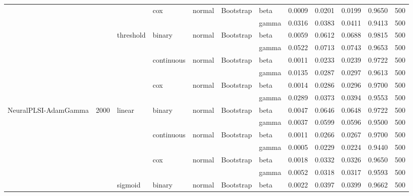 \begin{tabular}{lllllllrrrrr}
\cline{4-12} \cline{5-12} \cline{6-12}
 &  &  & \multirow[t]{2}{*}{cox} & \multirow[t]{2}{*}{normal} & \multirow[t]{2}{*}{Bootstrap} & beta & 0.0009 & 0.0201 & 0.0199 & 0.9650 & 500 \\
 &  &  &  &  &  & gamma & 0.0316 & 0.0383 & 0.0411 & 0.9413 & 500 \\
\cline{3-12} \cline{4-12} \cline{5-12} \cline{6-12}
 &  & \multirow[t]{6}{*}{threshold} & \multirow[t]{2}{*}{binary} & \multirow[t]{2}{*}{normal} & \multirow[t]{2}{*}{Bootstrap} & beta & 0.0059 & 0.0612 & 0.0688 & 0.9815 & 500 \\
 &  &  &  &  &  & gamma & 0.0522 & 0.0713 & 0.0743 & 0.9653 & 500 \\
\cline{4-12} \cline{5-12} \cline{6-12}
 &  &  & \multirow[t]{2}{*}{continuous} & \multirow[t]{2}{*}{normal} & \multirow[t]{2}{*}{Bootstrap} & beta & 0.0011 & 0.0233 & 0.0239 & 0.9722 & 500 \\
 &  &  &  &  &  & gamma & 0.0135 & 0.0287 & 0.0297 & 0.9613 & 500 \\
\cline{4-12} \cline{5-12} \cline{6-12}
 &  &  & \multirow[t]{2}{*}{cox} & \multirow[t]{2}{*}{normal} & \multirow[t]{2}{*}{Bootstrap} & beta & 0.0014 & 0.0286 & 0.0296 & 0.9700 & 500 \\
 &  &  &  &  &  & gamma & 0.0289 & 0.0373 & 0.0394 & 0.9553 & 500 \\
\cline{1-12} \cline{2-12} \cline{3-12} \cline{4-12} \cline{5-12} \cline{6-12}
\multirow[t]{18}{*}{NeuralPLSI-AdamGamma} & \multirow[t]{18}{*}{2000} & \multirow[t]{6}{*}{linear} & \multirow[t]{2}{*}{binary} & \multirow[t]{2}{*}{normal} & \multirow[t]{2}{*}{Bootstrap} & beta & 0.0047 & 0.0646 & 0.0648 & 0.9722 & 500 \\
 &  &  &  &  &  & gamma & 0.0037 & 0.0599 & 0.0596 & 0.9500 & 500 \\
\cline{4-12} \cline{5-12} \cline{6-12}
 &  &  & \multirow[t]{2}{*}{continuous} & \multirow[t]{2}{*}{normal} & \multirow[t]{2}{*}{Bootstrap} & beta & 0.0011 & 0.0266 & 0.0267 & 0.9700 & 500 \\
 &  &  &  &  &  & gamma & 0.0005 & 0.0229 & 0.0224 & 0.9440 & 500 \\
\cline{4-12} \cline{5-12} \cline{6-12}
 &  &  & \multirow[t]{2}{*}{cox} & \multirow[t]{2}{*}{normal} & \multirow[t]{2}{*}{Bootstrap} & beta & 0.0018 & 0.0332 & 0.0326 & 0.9650 & 500 \\
 &  &  &  &  &  & gamma & 0.0052 & 0.0318 & 0.0317 & 0.9593 & 500 \\
\cline{3-12} \cline{4-12} \cline{5-12} \cline{6-12}
 &  & \multirow[t]{6}{*}{sigmoid} & \multirow[t]{2}{*}{binary} & \multirow[t]{2}{*}{normal} & \multirow[t]{2}{*}{Bootstrap} & beta & 0.0022 & 0.0397 & 0.0399 & 0.9662 & 500 \\

\end{tabular}
